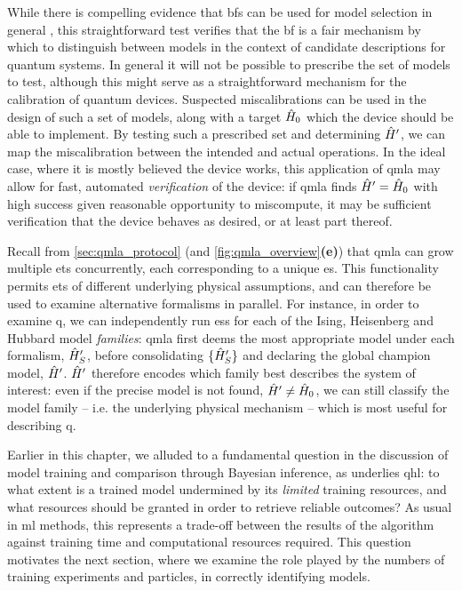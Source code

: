 While there is compelling evidence that \glspl{bf} can be used for model selection in general \cite{berger1996intrinsic}, 
    this straightforward test verifies that the \gls{bf} is a fair mechanism by which to distinguish between 
    models in the context of candidate descriptions for quantum systems. 
In general it will not be possible to prescribe the set of models to test, 
    although this might serve as a straightforward mechanism for the calibration of quantum devices.
Suspected miscalibrations can be used in the design of such a set of models, 
    along with a target $\hat{H}_0$ which the device should be able to implement. 
By testing such a prescribed set and determining $\hat{H}^{\prime}$, 
    we can map the miscalibration between the intended and actual operations. 
In the ideal case, where it is mostly believed the device works, 
    this application of \gls{qmla} may allow for fast, automated \emph{verification} of the device:
    if \gls{qmla} finds $\hat{H}^{\prime}=\hat{H}_0$ with high success given reasonable opportunity to miscompute, 
    it may be sufficient verification that the device behaves as desired, 
    or at least part thereof. 

    

Recall from \cref{sec:qmla_protocol} (and \cref{fig:qmla_overview}\textbf{(e)}) that \gls{qmla} 
    can grow multiple \glspl{et} concurrently, each corresponding to a unique \gls{es}. 
This functionality permits \glspl{et} of different underlying physical assumptions, 
    and can therefore be used to examine alternative formalisms in parallel.
For instance, in order to examine \gls{q}, 
    we can independently run \glspl{es} for each of the Ising, Heisenberg and Hubbard model \emph{families}:
    \gls{qmla} first deems the most appropriate model under each formalism, $\hat{H}^{\prime}_S$,
    before consolidating $\{\hat{H}^{\prime}_S\}$ and declaring the global \gls{champion model}, $\hat{H}^{\prime}$. 
$\hat{H}^{\prime}$ therefore encodes which family best describes the system of interest:
    even if the precise model is not found, $\hat{H}^{\prime} \neq \hat{H}_0$, we can still classify the 
    model family -- i.e. the underlying physical mechanism -- which is most useful for describing \gls{q}. 
\par 

Earlier in this chapter, we alluded to a fundamental question in the discussion of model training and comparison 
    through Bayesian inference, as underlies \gls{qhl}:
    to what extent is a trained model undermined by its \emph{limited} training resources\footnotemark, 
    and what resources should be granted in order to retrieve reliable outcomes?
As usual in \gls{ml} methods, this represents a trade-off between the results of the algorithm 
    against training time and computational resources required.
This question motivates the next section, 
    where we examine the role played by the numbers of training \glspl{experiment} and \glspl{particle},
    in correctly identifying models. 
\par

